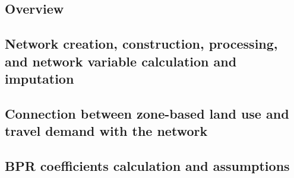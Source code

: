 \subsection{Overview}
\subsection{Network creation, construction, processing, and network variable calculation and imputation}
\subsection{Connection between zone-based land use and travel demand with the network}
\subsection{BPR coefficients calculation and assumptions}